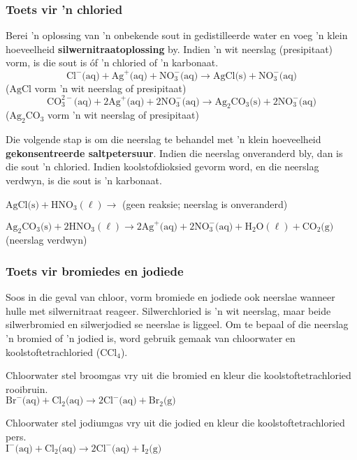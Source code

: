             \subsubsection*{Toets vir 'n chloried}
            \nopagebreak
Berei 'n oplossing van  'n onbekende sout in gedistilleerde water en voeg 'n klein hoeveelheid \textbf{silwernitraatoplossing} by. Indien 'n wit neerslag (presipitaat) vorm, is die sout is óf 'n chloried of 'n karbonaat.
        \label{m38719*id341148}\nopagebreak\noindent{}
    \begin{equation*}
    {\text{Cl}}^{-} \text{(aq)} +{\text{Ag}}^{+} \text{(aq)} + \text{NO}_{3}^{-} \text{(aq)} \to \text{AgCl} \text{(s)} +\text{NO}_{3}^{-} \text{(aq)}
      \end{equation*}
     ($\text{AgCl}$ vorm 'n wit neerslag of presipitaat)
        \label{m38719*id341211}\nopagebreak\noindent{}
    \begin{equation*}
    \text{CO}_{3}^{2-} \text{(aq)} + 2{\text{Ag}}^{+} \text{(aq)} + 2\text{NO}_{3}^{-} \text{(aq)} \to {\text{Ag}}_{2}{\text{CO}}_{3} \text{(s)} + 2\text{NO}_{3}^{-} \text{(aq)}
      \end{equation*}
    (${\text{Ag}}_{2}{\text{CO}}_{3}$ vorm 'n wit neerslag of presipitaat)\par 
        \label{m38719*id341323}Die volgende stap is om die neerslag te behandel met 'n klein hoeveelheid \textbf{gekonsentreerde saltpetersuur}. Indien die neerslag onveranderd bly, dan is die sout 'n chloried.  Indien koolstofdioksied gevorm word, en die neerslag verdwyn, is die sout is 'n karbonaat.\par 
        $\text{AgCl} \text{(s)} + {\text{HNO}}_{3} (\ell) \to $ (geen reaksie; neerslag is onveranderd)\par 
        ${\text{Ag}}_{2}{\text{CO}}_{3} \text{(s)} + 2{\text{HNO}}_{3} (\ell) \to 2{\text{Ag}^{+}} \text{(aq)} + 2\text{NO}_{3}^{-} \text{(aq)} + {\text{H}}_{2}\text{O} (\ell) + {\text{CO}}_{2} \text{(g)} $ (neerslag verdwyn)\par 

\subsubsection*{Toets vir bromiedes en jodiede}
\nopagebreak
Soos in die geval van chloor, vorm bromiede en jodiede ook neerslae wanneer hulle met silwernitraat reageer. Silwerchloried is 'n wit neerslag, maar beide silwerbromied en silwerjodied se neerslae is liggeel. Om te bepaal of die neerslag 'n bromied of 'n jodied is, word gebruik gemaak van chloorwater en koolstoftetrachloried (${\text{CCl}}_{4}$).\par 
Chloorwater stel broomgas vry uit die bromied en kleur die koolstoftetrachloried rooibruin.\\
$\text{Br}^{-} \text{(aq)} + \text{Cl}_{2} \text{(aq)} \to 2 \text{Cl}^{-} \text{(aq)} + \text{Br}_{2} \text{(g)}$
\par 
Chloorwater stel jodiumgas vry uit die jodied en kleur die koolstoftetrachloried pers.\\
$\text{I}^{-} \text{(aq)} + \text{Cl}_{2} \text{(aq)} \to 2 \text{Cl}^{-} \text{(aq)} + \text{I}_{2} \text{(g)}$
\par 

